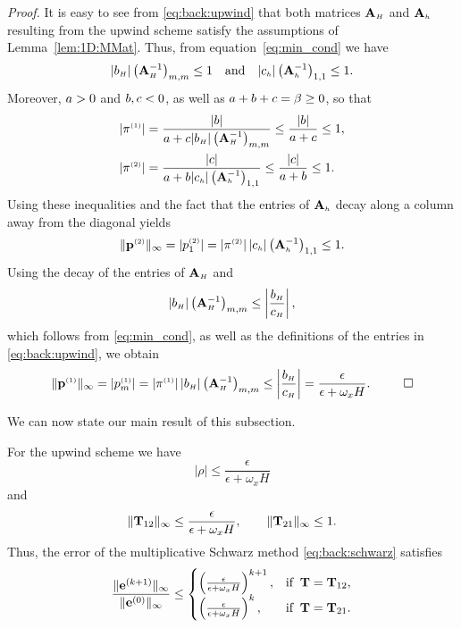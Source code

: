 {\em Proof.}
It is easy to see from \eqref{eq:back:upwind} that both matrices $\mathbf{A}_{\scriptscriptstyle H}$ and
$\mathbf{A}_{\scriptscriptstyle h}$ resulting from the upwind scheme satisfy the assumptions of
Lemma~\ref{lem:1D:MMat}. Thus, from equation~\eqref{eq:min_cond} we have
%
$$|b_{\scriptscriptstyle H}| \left(\mathbf{A}_{\scriptscriptstyle H} ^{-1}\right)_{m,m} \leq 1 \quad\mbox{and}\quad
|c_{\scriptscriptstyle h}| \left(\mathbf{A}_{\scriptscriptstyle h} ^{-1}\right)_{1,1} \leq 1.$$
%
Moreover, $a>0$ and $b,c<0$, as well as
$a+b+c=\beta \geq 0$, so that
%
\begin{align*}
|\pi^{\scriptscriptstyle (1)}|&=\frac{|b| }{a +c |b_{\scriptscriptstyle H}|  \left(\mathbf{A}_{\scriptscriptstyle H} ^{-1}\right)_{m,m}}
\leq\frac{|b| }{a + c}\leq 1,\\
|\pi^{\scriptscriptstyle (2)}|&=\frac{|c| }{a + b |c_{\scriptscriptstyle h}| \left(\mathbf{A}_{\scriptscriptstyle h} ^{-1}\right)_{1,1}}\leq
\frac{|c| }{a + b}\leq 1.
\end{align*}
%
Using these inequalities and the fact that the entries of $\mathbf{A}_{\scriptscriptstyle h}$ decay along
a column away from the diagonal yields
%
$$\|\mathbf{p}^{\scriptscriptstyle (2)}\|_\infty=|p^{\scriptscriptstyle (2)}_1|=|\pi^{\scriptscriptstyle (2)}|\,|c_{\scriptscriptstyle h}| \left(\mathbf{A}_{\scriptscriptstyle h} ^{-1}\right)_{1,1}\leq 1.$$
%
Using the decay of the entries of $\mathbf{A}_{\scriptscriptstyle H}$ and
%
$$|b_{\scriptscriptstyle H}|  \left(\mathbf{A}_{\scriptscriptstyle H} ^{-1}\right)_{m,m} \leq \left|\frac{b_{\scriptscriptstyle H}}{c_{\scriptscriptstyle H}}\right|,$$
%
which follows from \eqref{eq:min_cond}, as well as the definitions of the
entries in \eqref{eq:back:upwind}, we obtain
%
$$\|\pOne\|_\infty = |p^{\klein{(1)}}_m| = |\piOne|\,|\entryvE|
\left(\matAH ^{-1}\right)_{m,m}
\leq \left|\frac{\entryvE}{\entryvW}\right| =
\frac{\epsilon}{\epsilon+\omega_x H%
}. ~~ \qed
$$
%

We can now state our main result of this subsection.

\begin{thm} \label{thm:1D:upwind_conv}
For the upwind scheme we have
%
\begin{equation}\label{eq:1D:bound_upw}
|\rho| \leq \frac{\epsilon}{\epsilon+\omega_x H}
\end{equation}
%
and
%
\begin{align*}
\| \mathbf{T}_{12} \|_\infty \leq \frac{\epsilon}{\epsilon+\omega_x H},\qquad
\| \mathbf{T}_{21} \|_\infty \leq 1.
\end{align*}
%
Thus, the error of the multiplicative Schwarz method \eqref{eq:back:schwarz}
satisfies
%
$$\frac{\|\mathbf{e}^{(k+1)}\|_\infty}{\|\mathbf{e}^{(0)}\|_\infty} \leq
\begin{cases} \left( \frac{\epsilon}{\epsilon+\omega_x H}\right)^{k+1}, &\mbox{if}\;\; \mathbf{T}=\mathbf{T}_{12}, \\
\left( \frac{\epsilon}{\epsilon+\omega_x H}\right)^{k}, &\mbox{if}\;\; \mathbf{T}=\mathbf{T}_{21}. \end{cases}$$
%
\end{thm}


